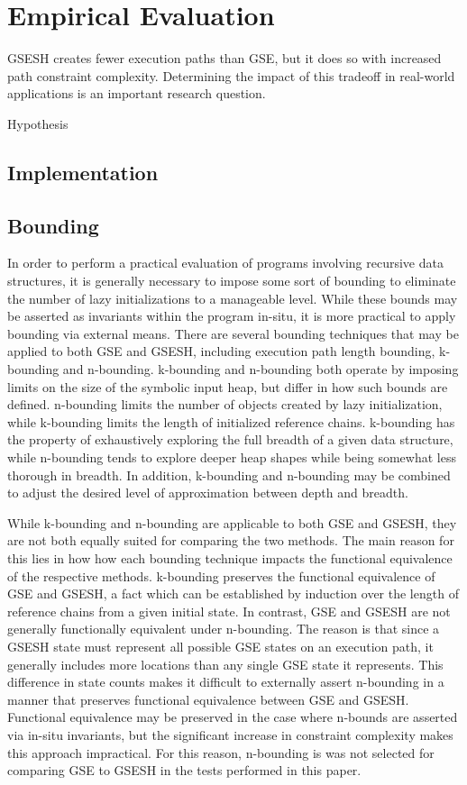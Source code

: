 \section{Empirical Evaluation}
GSESH creates fewer execution paths than GSE, but it does so with increased path constraint complexity. Determining the impact of this tradeoff in real-world applications is an important research question. 

Hypothesis

\subsection{Implementation}

\subsection{Bounding}
In order to perform a practical evaluation of programs involving recursive data structures, it is generally necessary to impose some sort of bounding to eliminate the number of lazy initializations to a manageable level. While these bounds may be asserted as invariants within the program in-situ, it is more practical to apply bounding via external means. There are several bounding techniques that may be applied to both GSE and GSESH, including execution path length bounding, k-bounding and n-bounding. k-bounding and n-bounding both operate by imposing limits on the size of the symbolic input heap, but differ in how such bounds are defined. n-bounding limits the number of objects created by lazy initialization, while k-bounding limits the length of initialized reference chains. k-bounding has the property of exhaustively exploring the full breadth of a given data structure, while n-bounding tends to explore deeper heap shapes while being somewhat less thorough in breadth. In addition, k-bounding and n-bounding may be combined to adjust the desired level of approximation between depth and breadth. 

While k-bounding and n-bounding are applicable to both GSE and GSESH, they are not both equally suited for comparing the two methods. The main reason for this lies in how how each bounding technique impacts the functional equivalence of the respective methods.  k-bounding preserves the functional equivalence of GSE and GSESH, a fact which can be established by induction over the length of reference chains from a given initial state. In contrast, GSE and GSESH are not generally functionally equivalent under n-bounding. The reason is that since a GSESH state must represent all possible GSE states on an execution path, it generally includes more locations than any single GSE state it represents. This difference in state counts makes it difficult to externally assert n-bounding in a manner that preserves functional equivalence between GSE and GSESH. Functional equivalence may be preserved in the case where n-bounds are asserted via in-situ invariants, but the significant increase in constraint complexity makes this approach impractical. For this reason, n-bounding is was not selected for comparing GSE to GSESH in the tests performed in this paper.

